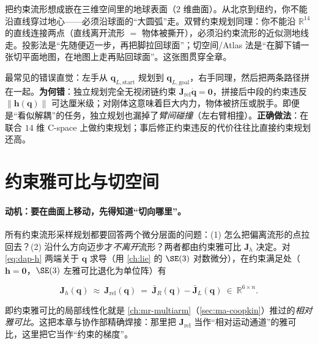 \begin{insight}
把约束流形想成嵌在三维空间里的地球表面（$2$ 维曲面）。从北京到纽约，你不能沿直线穿过地心——必须沿球面的“大圆弧”走。双臂约束规划同理：你不能沿 $\mathbb{R}^{14}$ 的直线连接两点（直线离开流形 $=$ 物体被撕开），必须沿约束流形的近似测地线走。投影法是“先随便迈一步，再把脚拉回球面”；切空间/Atlas 法是“在脚下铺一张切平面地图，在地图上走再贴回球面”。这张图贯穿全章。
\end{insight}

\begin{pitfall}[“两只手分别规划再拼起来”]
最常见的错误直觉：左手从 $\mathbf{q}_{L,\text{start}}$ 规划到 $\mathbf{q}_{L,\text{goal}}$，右手同理，然后把两条路径拼在一起。\textbf{为何错}：独立规划完全无视闭链约束 $\mathbf{J}_{\text{rel}}\dot{\mathbf{q}}=\mathbf{0}$，拼接后中段的约束违反 $\|\mathbf{h}(\mathbf{q})\|$ 可达厘米级；对刚体这意味着巨大内力，物体被挤压或脱手。即便是“看似解耦”的任务，独立规划也漏掉了\emph{臂间碰撞}（左右臂相撞）。\textbf{正确做法}：在联合 $14$ 维 C-space 上做约束规划；事后修正约束违反的代价往往比直接约束规划还高。
\end{pitfall}

\section{约束雅可比与切空间}
\label{sec:dap-tangent}

\paragraph{动机：要在曲面上移动，先得知道“切向哪里”。}
所有约束流形采样规划都要回答两个微分层面的问题：(1) 怎么把偏离流形的点拉回去？(2) 沿什么方向迈步才\emph{不离开}流形？两者都由约束雅可比 $\mathbf{J}_h$ 决定。对 \cref{eq:dap-h} 两端关于 $\mathbf{q}$ 求导（用 \cref{ch:lie} 的 $\SE(3)$ 对数微分），在约束满足处（$\mathbf{h}=\mathbf{0}$，$\SE(3)$ 左雅可比退化为单位阵）有

\begin{equation}
  \mathbf{J}_h(\mathbf{q})\ \approx\ \mathbf{J}_{\text{rel}}(\mathbf{q})\ =\ \bar{\mathbf{J}}_R(\mathbf{q})-\bar{\mathbf{J}}_L(\mathbf{q})\ \in\ \mathbb{R}^{6\times n}.
  \label{eq:dap-Jh}
\end{equation}

即约束雅可比的局部线性化就是 \cref{ch:mr-multiarm}（\cref{sec:ma-coopkin}）推过的\emph{相对雅可比}。这把本章与协作部精确焊接：那里把 $\mathbf{J}_{\text{rel}}$ 当作“相对运动通道”的雅可比，这里把它当作“约束的梯度”。

